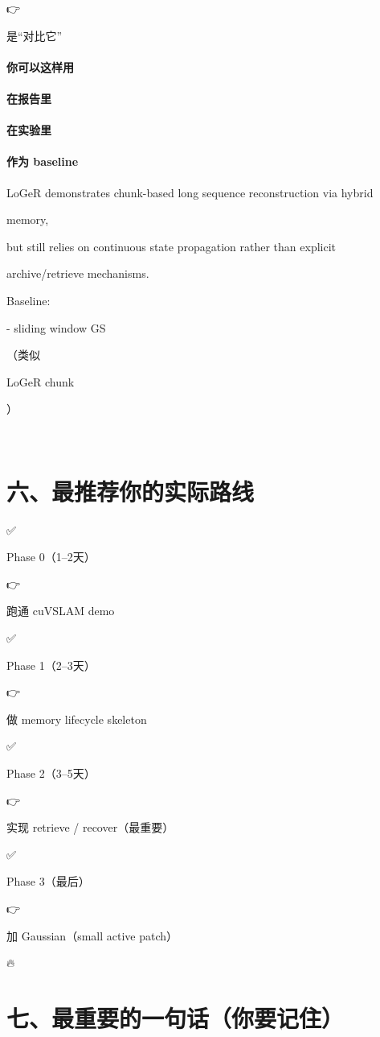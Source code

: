 \documentclass[12pt]{article}
\begin{document}
👉

是“对比它”

\paragraph{你可以这样用}
\paragraph{在报告里}
\paragraph{在实验里}
\paragraph{作为 baseline}
LoGeR demonstrates chunk-based long sequence reconstruction via hybrid

memory,

but still relies on continuous state propagation rather than explicit

archive/retrieve mechanisms.

Baseline:

- sliding window GS

（类似

LoGeR chunk

）

🎯

\section{六、最推荐你的实际路线}
✅

Phase 0（1–2天）

👉

跑通 cuVSLAM demo

✅

Phase 1（2–3天）

👉

做 memory lifecycle skeleton

✅

Phase 2（3–5天）

👉

实现 retrieve / recover（最重要）

✅

Phase 3（最后）

👉

加 Gaussian（small active patch）

🔥

\section{七、最重要的一句话（你要记住）}
🧭
\end{document}
